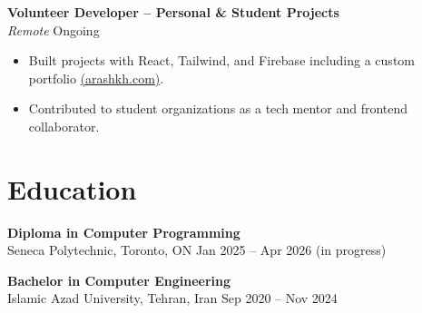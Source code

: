\documentclass[letterpaper,11pt]{article}
\begin{document}
\textbf{Volunteer Developer – Personal & Student Projects}\\
\textit{Remote} \hfill Ongoing
\begin{itemize}[leftmargin=*]
  \item Built projects with React, Tailwind, and Firebase including a custom portfolio \href{https://arashkh.com}{(arashkh.com)}.
  \item Contributed to student organizations as a tech mentor and frontend collaborator.
\end{itemize}

\section*{Education}
\textbf{Diploma in Computer Programming} \\ Seneca Polytechnic, Toronto, ON \hfill Jan 2025 -- Apr 2026 (in progress)

\textbf{Bachelor in Computer Engineering} \\ Islamic Azad University, Tehran, Iran \hfill Sep 2020 -- Nov 2024
\end{document}
